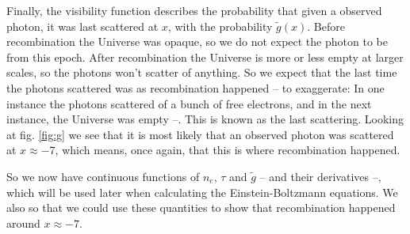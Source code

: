 \documentclass[a4paper,norsk, 10pt]{article}
\begin{document}
Finally, the visibility function describes the probability that given a observed photon, it was last scattered at $x$, with the probability $\tilde{g}(x)$. Before recombination the Universe was opaque, so we do not expect the photon to be from this epoch. After recombination the Universe is more or less empty at larger scales, so the photons won't scatter of anything. So we expect that the last time the photons scattered was as recombination happened -- to exaggerate: In one instance the photons scattered of a bunch of free electrons, and in the next instance, the Universe was empty --. This is known as the last scattering. Looking at fig. \ref{fig:g} we see that it is most likely that an observed photon was scattered at $x\approx -7$, which means, once again, that this is where recombination happened.

So we now have continuous functions of $n_e$, $\tau$ and $\tilde{g}$ -- and their derivatives --, which will be used later when calculating the Einstein-Boltzmann equations. We also so that we could use these quantities to show that recombination happened around $x\approx -7$.
\end{document}
